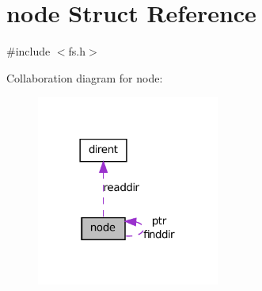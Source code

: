 \hypertarget{structnode}{
\section{node Struct Reference}
\label{structnode}
}


{\ttfamily \#include $<$fs.h$>$}



Collaboration diagram for node:\nopagebreak
\begin{figure}[H]
\begin{center}
\leavevmode
\includegraphics[width=170pt]{structnode__coll__graph}
\end{center}
\end{figure}
